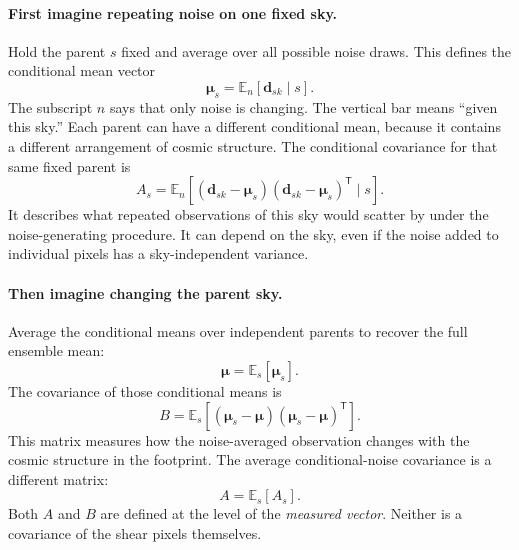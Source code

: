 \documentclass[11pt]{article}
\newcommand{\T}{^{\mathsf{T}}}
\newcommand{\E}{\mathbb{E}}
\begin{document}
\paragraph{First imagine repeating noise on one fixed sky.}
Hold the parent $s$ fixed and average over all possible noise draws. This
defines the conditional mean vector
\begin{equation}
 \boldsymbol\mu_s=\E_n[\boldsymbol d_{sk}\mid s].
\end{equation}
The subscript $n$ says that only noise is changing. The vertical bar means
``given this sky.'' Each parent can have a different conditional mean,
because it contains a different arrangement of cosmic structure.
The conditional covariance for that same fixed parent is
\begin{equation}
 A_s=\E_n[(\boldsymbol d_{sk}-\boldsymbol\mu_s)
         (\boldsymbol d_{sk}-\boldsymbol\mu_s)\T\mid s].
\end{equation}
It describes what repeated observations of this sky would scatter by under
the noise-generating procedure. It can depend on the sky, even if the
noise added to individual pixels has a sky-independent variance.

\paragraph{Then imagine changing the parent sky.}
Average the conditional means over independent parents to recover the
full ensemble mean:
\begin{equation}
 \boldsymbol\mu=\E_s[\boldsymbol\mu_s].
\end{equation}
The covariance of those conditional means is
\begin{equation}
 B=\E_s[(\boldsymbol\mu_s-\boldsymbol\mu)
        (\boldsymbol\mu_s-\boldsymbol\mu)\T].
\end{equation}
This matrix measures how the noise-averaged observation changes with the
cosmic structure in the footprint. The average conditional-noise
covariance is a different matrix:
\begin{equation}
 A=\E_s[A_s].
\end{equation}
Both $A$ and $B$ are defined at the level of the \emph{measured vector}.
Neither is a covariance of the shear pixels themselves.
\end{document}
